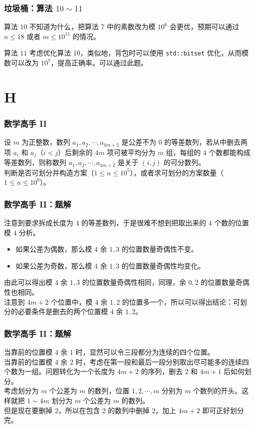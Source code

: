\documentclass{beamer}
\begin{document}
\begin{frame}
\frametitle{垃圾桶：算法 $10 \sim 11$}
\begin{block}{算法 $10$}
不知道为什么，把算法 7 中的素数改为模 $10^6$ 会更优，预期可以通过 $n \leq 18$ 或者 $m \leq 10^{11}$ 的情况。
\end{block}
\pause
\begin{block}{算法 $11$}
考虑优化算法 10，类似地，背包时可以使用 \texttt{std::bitset} 优化，从而模数可以改为 $10^7$，提高正确率。可以通过此题。
\end{block}
\end{frame}

\section{H}

\begin{frame}
\frametitle{数学高手 II}
设 $m$ 为正整数，数列 $a_1,a_2,\cdots,a_{4m+2}$ 是公差不为 $0$ 的等差数列，若从中删去两项 $a_i$ 和 $a_j$（$i < j$）后剩余的 $4m$ 项可被平均分为 $m$ 组，每组的 $4$ 个数都能构成等差数列，则称数列 $a_1,a_2,\cdots,a_{4m+2}$ 是关于 $(i,j)$ 的可分数列。\\
判断是否可划分并构造方案（$1 \leq n \leq 10^5$），或者求可划分的方案数量（$1 \leq n \leq 10^9$）。
\end{frame}

\begin{frame}
\frametitle{数学高手 II：题解}
注意到要求拆成长度为 $4$ 的等差数列，于是很难不想到把取出来的 $4$ 个数的位置模 $4$ 分析。\\
\pause
\begin{itemize}
\item 如果公差为偶数，那么模 $4$ 余 $1,3$ 的位置数量奇偶性不变。
\pause
\item 如果公差为奇数，那么模 $4$ 余 $1,3$ 的位置数量奇偶性均变化。
\end{itemize}
\pause
由此可以得出模 $4$ 余 $1,3$ 的位置数量奇偶性相同，同理，余 $0,2$ 的位置数量奇偶性也相同。\\
\pause
注意到 $4m+2$ 个位置中，模 $4$ 余 $1,2$ 的位置多一个，所以可以得出结论：可划分的必要条件是删去的两个位置模 $4$ 余 $1,2$。
\end{frame}

\begin{frame}
\frametitle{数学高手 II：题解}
当靠前的位置模 $4$ 余 $1$ 时，显然可以令三段都分为连续的四个位置。\\
\pause
当靠前的位置模 $4$ 余 $2$ 时，考虑在第一段和最后一段分别取出尽可能多的连续四个数为一组。问题转化为一个长度为 $4m+2$ 的序列，删去 $2$ 和 $4m+1$ 后如何划分。\\
\pause
考虑划分为 $m$ 个公差为 $m$ 的数列，位置 $1,2,\cdots,m$ 分别为 $m$ 个数列的开头。这样就把 $1 \sim 4m$ 划分为 $m$ 个公差为 $m$ 的数列。\\
\pause
但是现在要删掉 $2$，所以在包含 $2$ 的数列中删掉 $2$，加上 $4m+2$ 即可正好划分完。
\end{frame}
\end{document}
